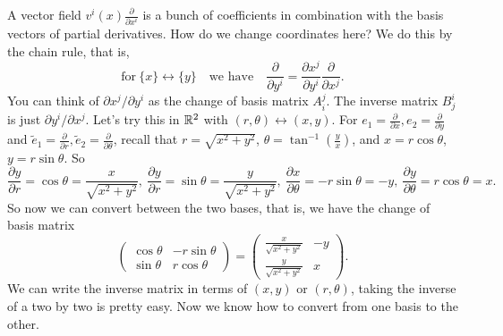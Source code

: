 A vector field $v^i (x) \frac{\partial }{\partial x^i }$ is a bunch of coefficients in combination with the basis vectors of partial derivatives. How do we change coordinates here? We do this by the chain rule, that is, \[
\text{for} \ \{x\} \longleftrightarrow \{y\} \quad \text{we have} \quad \frac{\partial }{\partial y^i }= \frac{\partial x^j }{\partial y^i }\frac{\partial }{\partial x^j }.
\] 
You can think of $\partial x^j / \partial y^i $ as the change of basis matrix $A^j _i $. The inverse matrix $B^i_j $ is just $\partial  y^i /\partial x^j $. Let's try this in $\mathbb{R}^2$ with $(r, \theta) \leftrightarrow (x,y)$. For $e_1= \frac{\partial}{\partial x}, e_2=\frac{\partial}{\partial y} $ and $\widetilde e_1= \frac{\partial }{\partial r}, \widetilde e_2= \frac{\partial }{\partial \theta}$, recall that $r = \sqrt{x^2+y^2} $, $\theta=\tan ^{-1} \left(\frac{y}{x}\right)$, and $x=r \cos \theta$, $y=r \sin \theta$. So \[
\frac{\partial y}{\partial r}= \cos \theta=\frac{x}{\sqrt{x^2+y^2} }, \ \frac{\partial y}{\partial r}= \sin \theta=\frac{y}{\sqrt{x^2+y^2} }, \ \frac{\partial x}{\partial \theta}= - r \sin \theta=-y, \ \frac{\partial y}{\partial \theta}=r \cos \theta=x.
\] So now we can convert between the two bases, that is, we have the change of basis matrix
\[
\begin{pmatrix}
    \cos \theta & -r \sin \theta \\ \sin \theta & r \cos \theta
\end{pmatrix}= 
\begin{pmatrix}
    \frac{x}{\sqrt{x^2+y^2} } & -y \\
    \frac{y}{\sqrt{x^2+y^2} } & x
\end{pmatrix}.
\] We can write the inverse matrix in terms of $(x,y)$ or $(r,\theta)$, taking the inverse of a two by two is pretty easy. Now we know how to convert from one basis to the other.
